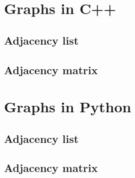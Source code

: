 \documentclass{article}
\begin{document}
\section{Graphs in C++}

\subsection{Adjacency list}



\subsection{Adjacency matrix}



\section{Graphs in Python}

\subsection{Adjacency list}



\subsection{Adjacency matrix}


\end{document}
